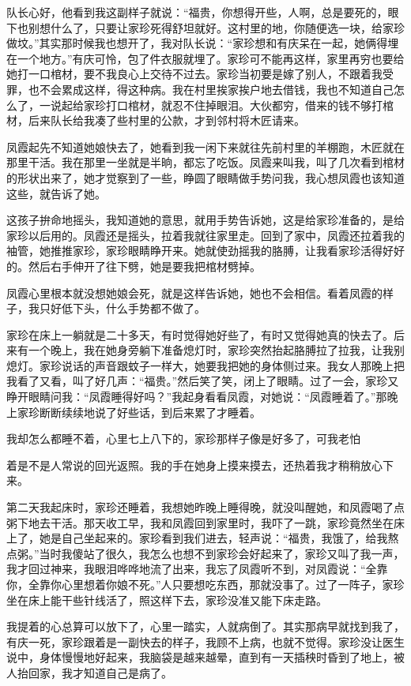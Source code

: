 \documentclass[12pt,UTF8]{ctexbook}
\begin{document}
队长心好，他看到我这副样子就说：“福贵，你想得开些，人啊，总是要死的，眼下也别想什么了，只要让家珍死得舒坦就好。这村里的地，你随便选一块，给家珍做坟。”其实那时候我也想开了，我对队长说：“家珍想和有庆呆在一起，她俩得埋在一个地方。”有庆可怜，包了件衣服就埋了。家珍可不能再这样，家里再穷也要给她打一口棺材，要不我良心上交待不过去。家珍当初要是嫁了别人，不跟着我受罪，也不会累成这样，得这种病。我在村里挨家挨户地去借钱，我也不知道自己怎么了，一说起给家珍打口棺材，就忍不住掉眼泪。大伙都穷，借来的钱不够打棺材，后来队长给我凑了些村里的公款，才到邻村将木匠请来。

凤霞起先不知道她娘快去了，她看到我一闲下来就往先前村里的羊棚跑，木匠就在那里干活。我在那里一坐就是半晌，都忘了吃饭。凤霞来叫我，叫了几次看到棺材的形状出来了，她才觉察到了一些，睁圆了眼睛做手势问我，我心想凤霞也该知道这些，就告诉了她。

这孩子拚命地摇头，我知道她的意思，就用手势告诉她，这是给家珍准备的，是给家珍以后用的。凤霞还是摇头，拉着我就往家里走。回到了家中，凤霞还拉着我的袖管，她推推家珍，家珍眼睛睁开来。她就使劲摇我的胳膊，让我看家珍活得好好的。然后右手伸开了往下劈，她是要我把棺材劈掉。

凤霞心里根本就没想她娘会死，就是这样告诉她，她也不会相信。看着凤霞的样子，我只好低下头，什么手势都不做了。

家珍在床上一躺就是二十多天，有时觉得她好些了，有时又觉得她真的快去了。后来有一个晚上，我在她身旁躺下准备熄灯时，家珍突然抬起胳膊拉了拉我，让我别熄灯。家珍说话的声音跟蚊子一样大，她要我把她的身体侧过来。我女人那晚上把我看了又看，叫了好几声：“福贵。”然后笑了笑，闭上了眼睛。过了一会，家珍又睁开眼睛问我：“凤霞睡得好吗？”我起身看看凤霞，对她说：“凤霞睡着了。”那晚上家珍断断续续地说了好些话，到后来累了才睡着。

我却怎么都睡不着，心里七上八下的，家珍那样子像是好多了，可我老怕


着是不是人常说的回光返照。我的手在她身上摸来摸去，还热着我才稍稍放心下来。

第二天我起床时，家珍还睡着，我想她昨晚上睡得晚，就没叫醒她，和凤霞喝了点粥下地去干活。那天收工早，我和凤霞回到家里时，我吓了一跳，家珍竟然坐在床上了，她是自己坐起来的。家珍看到我们进去，轻声说：“福贵，我饿了，给我熬点粥。”当时我傻站了很久，我怎么也想不到家珍会好起来了，家珍又叫了我一声，我才回过神来，我眼泪哗哗地流了出来，我忘了凤霞听不到，对凤霞说：“全靠你，全靠你心里想着你娘不死。”人只要想吃东西，那就没事了。过了一阵子，家珍坐在床上能干些针线活了，照这样下去，家珍没准又能下床走路。

我提着的心总算可以放下了，心里一踏实，人就病倒了。其实那病早就找到我了，有庆一死，家珍跟着是一副快去的样子，我顾不上病，也就不觉得。家珍没让医生说中，身体慢慢地好起来，我脑袋是越来越晕，直到有一天插秧时昏到了地上，被人抬回家，我才知道自己是病了。
\end{document}
